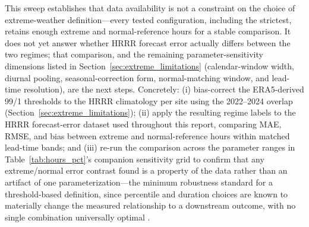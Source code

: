 This sweep establishes that data availability is not a constraint on the choice of extreme-weather
definition---every tested configuration, including the strictest, retains enough extreme and
normal-reference hours for a stable comparison. It does not yet answer whether HRRR forecast error
actually differs between the two regimes; that comparison, and the remaining
parameter-sensitivity dimensions listed in Section~\ref{sec:extreme_limitations} (calendar-window
width, diurnal pooling, seasonal-correction form, normal-matching window, and lead-time
resolution), are the next steps. Concretely: (i) bias-correct the ERA5-derived 99/1 thresholds to
the HRRR climatology per site using the \num{2022}--\num{2024} overlap
(Section~\ref{sec:extreme_limitations}); (ii) apply the resulting regime labels to the HRRR
forecast-error dataset used throughout this report, comparing MAE, RMSE, and bias between
extreme and normal-reference hours within matched lead-time bands; and (iii) re-run the comparison
across the parameter ranges in Table~\ref{tab:hours_pct}'s companion sensitivity grid to confirm
that any extreme/normal error contrast found is a property of the data rather than an artifact of
one parameterization---the minimum robustness standard for a threshold-based definition, since
percentile and duration choices are known to materially change the measured relationship to a
downstream outcome, with no single combination universally optimal \citep{perkinsalexander2013,puvvula2022}.
